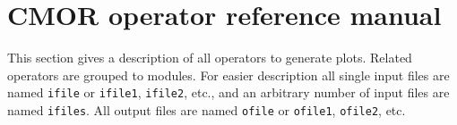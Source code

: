 \chapter{\label{refman}CMOR operator reference manual}

This section gives a description of all {\CDO} operators to generate plots.
Related operators are grouped to modules.
For easier description all single input files are named {\tt ifile} or {\tt ifile1}, {\tt ifile2}, etc.,
and an arbitrary number of input files are named {\tt ifiles}.
All output files are named {\tt ofile} or {\tt ofile1}, {\tt ofile2}, etc.


\hspace{3mm}



